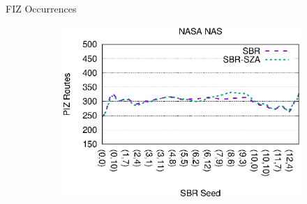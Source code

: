\begin{frame}{FIZ Occurrences}
\begin{center}
\begin{figure}
\begin{subfigure}{0.49\linewidth}
				\includegraphics[width=1.0\linewidth]{charts/nasa/nasa-piz-routes-bezier.eps}
			\end{subfigure}
		\end{figure}
	\end{center}
\end{frame}

